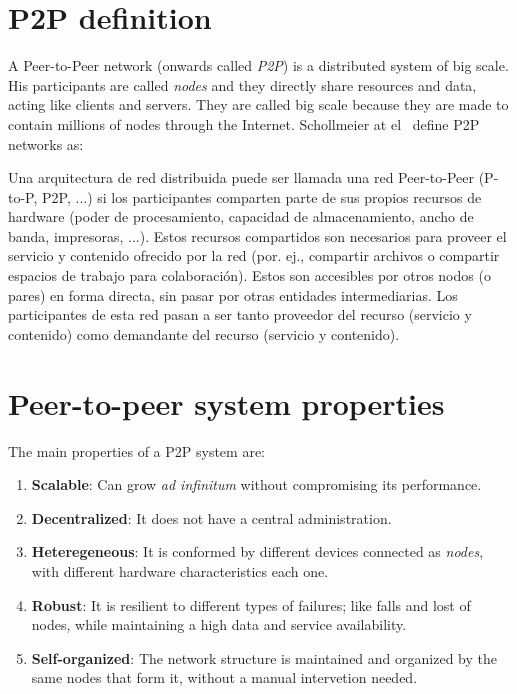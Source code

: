 %

\section{P2P definition}
\label{sec:p2p_definition}

A Peer-to-Peer network (onwards called \textit{P2P}) is a distributed system of big scale. His participants
are called \textit{nodes} and they directly share resources and data, acting
like clients and servers. They are called big scale because they are made to
contain millions of nodes through the Internet. Schollmeier at
el~\cite{conf_p2p_Schollmeier01} define P2P networks as:

\begin{mydef}
Una arquitectura de red
distribuida puede ser llamada una red Peer-to-Peer (P-to-P, P2P, ...) si los
participantes comparten parte de sus propios recursos de hardware (poder de
procesamiento, capacidad de almacenamiento, ancho de banda, impresoras, ...).
Estos recursos compartidos son necesarios para proveer el servicio y contenido
ofrecido por la red (por. ej., compartir archivos o compartir espacios de
trabajo para colaboración). Estos son accesibles por otros nodos (o pares) en forma
directa, sin pasar por otras entidades intermediarias. Los participantes de
esta red pasan a ser tanto proveedor del recurso (servicio y contenido) como
demandante del recurso (servicio y contenido).
\end{mydef}

\section{Peer-to-peer system properties}
\label{sec:p2p_characteristics}

The main properties of a P2P system are:
\begin{enumerate}
    \item \textbf{Scalable}: Can grow \textit{ad infinitum} without compromising its performance.
    \item \textbf{Decentralized}: It does not have a central administration.
    \item \textbf{Heteregeneous}: It is conformed by different devices
connected as \textit{nodes}, with different hardware characteristics each one.
    \item \textbf{Robust}: It is resilient to different types of failures; like
falls and lost of nodes, while maintaining a high data and service availability.
    \item \textbf{Self-organized}: The network structure is maintained and organized by the same nodes that form it, without a manual intervetion needed.
\end{enumerate}

